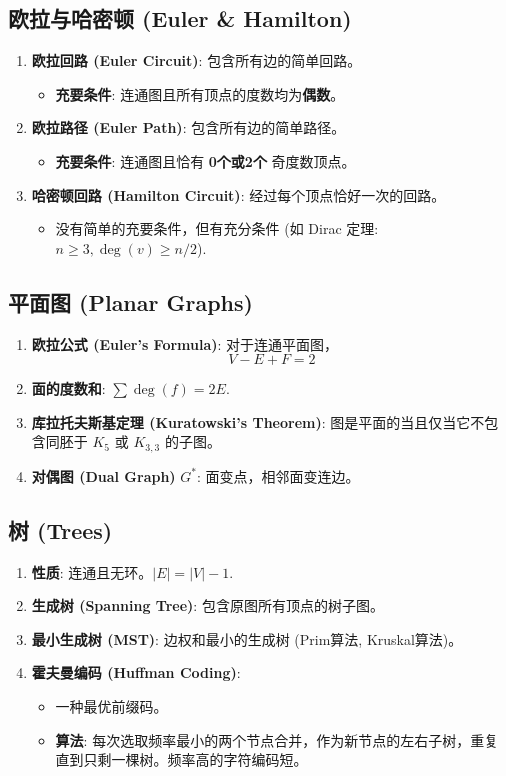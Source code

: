 \documentclass[a4paper,12pt]{ctexart}
\begin{document}
\subsection{欧拉与哈密顿 (Euler \& Hamilton)}
\begin{enumerate}
    \item \textbf{欧拉回路 (Euler Circuit)}: 包含所有边的简单回路。
    \begin{itemize}
        \item \textbf{充要条件}: 连通图且所有顶点的度数均为\textbf{偶数}。
    \end{itemize}
    \item \textbf{欧拉路径 (Euler Path)}: 包含所有边的简单路径。
    \begin{itemize}
        \item \textbf{充要条件}: 连通图且恰有 \textbf{0个或2个} 奇度数顶点。
    \end{itemize}
    \item \textbf{哈密顿回路 (Hamilton Circuit)}: 经过每个顶点恰好一次的回路。
    \begin{itemize}
        \item 没有简单的充要条件，但有充分条件 (如 Dirac 定理: $n \ge 3, \deg(v) \ge n/2$).
    \end{itemize}
\end{enumerate}

\subsection{平面图 (Planar Graphs)}
\begin{enumerate}
    \item \textbf{欧拉公式 (Euler's Formula)}: 对于连通平面图，
    $$V - E + F = 2$$
    \item \textbf{面的度数和}: $\sum \deg(f) = 2E$.
    \item \textbf{库拉托夫斯基定理 (Kuratowski's Theorem)}: 图是平面的当且仅当它不包含同胚于 $K_5$ 或 $K_{3,3}$ 的子图。
    \item \textbf{对偶图 (Dual Graph)} $G^*$: 面变点，相邻面变连边。
\end{enumerate}

\subsection{树 (Trees)}
\begin{enumerate}
    \item \textbf{性质}: 连通且无环。$|E| = |V| - 1$.
    \item \textbf{生成树 (Spanning Tree)}: 包含原图所有顶点的树子图。
    \item \textbf{最小生成树 (MST)}: 边权和最小的生成树 (Prim算法, Kruskal算法)。
    \item \textbf{霍夫曼编码 (Huffman Coding)}:
    \begin{itemize}
        \item 一种最优前缀码。
        \item \textbf{算法}: 每次选取频率最小的两个节点合并，作为新节点的左右子树，重复直到只剩一棵树。频率高的字符编码短。
    \end{itemize}
\end{enumerate}
\end{document}
